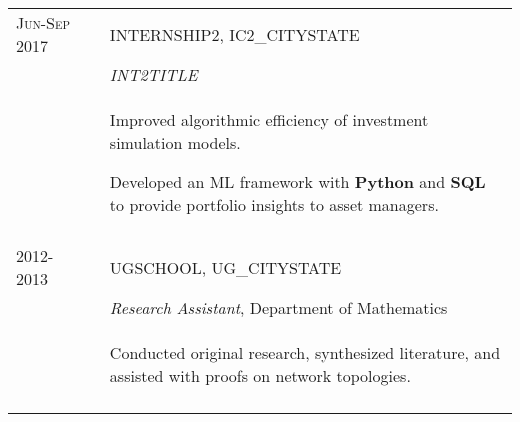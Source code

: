 \documentclass[a4paper,10pt]{article}
\begin{document}
\begin{supertabular}{l p{0.55cm} p{13.9cm}}
	\textsc{Jun-Sep 2017}	&& \textsc{INTERNSHIP2}, IC2_CITYSTATE \\
												&& \small	\emph{INT2TITLE} \\
												&& \begin{enumerate*}[label =$\diamond$, itemjoin={\newline}]
														\item \footnotesize Improved algorithmic efficiency of investment simulation models.
														\item \footnotesize Developed an ML framework with $\mathbf{Python}$ and $\mathbf{SQL}$ to provide portfolio insights to asset managers. \end{enumerate*} \\
	 \\



	\textsc{2012-2013}		&& \textsc{UGSCHOOL}, UG_CITYSTATE \\
	\textsc{}							&& \small	\emph{Research Assistant}, Department of Mathematics \\
												&& \begin{enumerate*}[label =$\diamond$, itemjoin={\newline}]
														\item \footnotesize Conducted original research, synthesized literature, and assisted with proofs on network topologies.
														\end{enumerate*} \\
	 \\


\end{supertabular}





\end{document}
